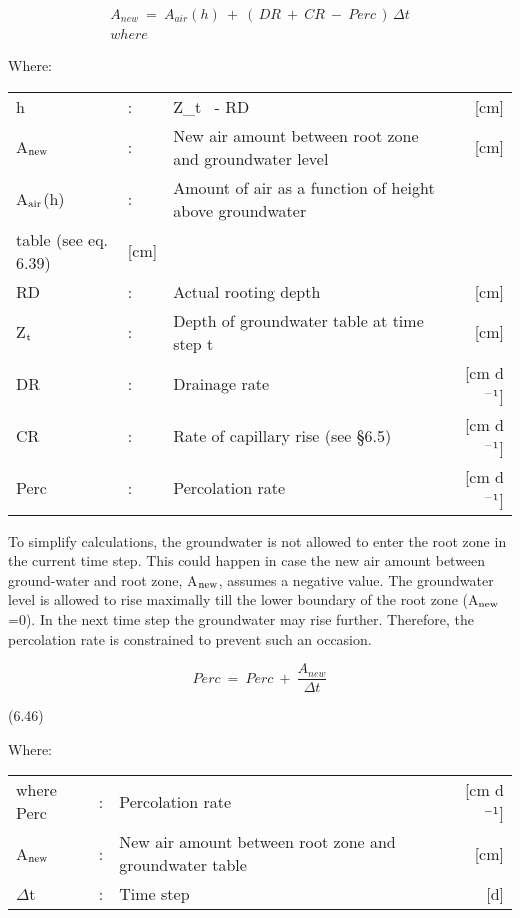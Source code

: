 \begin{align}
 A_{new} ~=~ A_{air} (h) ~+~ (\, DR ~+~ CR ~-~ Perc\, )\, \Delta t   \\
where~~ 
\end{align}

Where:\\
\begin{tabularx}{\textwidth}{llXr}
h &:& Z_{t~} - RD & [cm]\\
A$_{{\rm new}}$ &:& New air amount between root zone and groundwater level  & [cm]\\
A$_{{\rm air}}$(h) &:& Amount of air as a function of height above groundwater \\
   table  (see eq. 6.39) & [cm]\\
RD &:& Actual rooting depth  & [cm]\\
Z$_{{\rm t}}$ &:& Depth of groundwater table at time step t  & [cm]\\
DR &:& Drainage rate  & [cm d$^{{\rm -1}}$]\\
CR &:& Rate of capillary rise (see \S 6.5)  & [cm d$^{{\rm -1}}$]\\
Perc &:& Percolation rate  & [cm d$^{{\rm -1}}$]
\end{tabularx}

To simplify calculations, the groundwater is not allowed to enter the root zone in the
current time step. This could happen in case the new air amount between ground-water
and root zone, A$_{{\rm new}}$, assumes a negative value. The groundwater level is allowed to rise
maximally till the lower boundary of the root zone (A$_{{\rm new}}$=0). In the next time step the
groundwater may rise further. Therefore, the percolation rate is con\-strained to prevent
such an occasion. 

\begin{equation}
Perc ~=~Perc ~+~{\frac{A _{new} }{\Delta t}}
\end{equation}

 
\strut\hfill (6.46)

Where:\\
\begin{tabularx}{\textwidth}{llXr}



where Perc &:& Percolation rate   & [cm d$^{{\rm -1}}$]\\
A$_{{\rm new}}$ &:& New air amount between root zone and groundwater table  & [cm]\\
$\Delta$t &:& Time step  & [d]
\end{tabularx}


